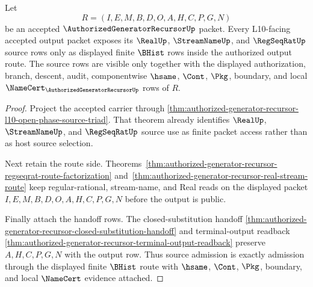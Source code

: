 \begin{theorem}
\label{thm:authorized-generator-recursor-l10-source-row-admission}
Let
$$
R=(I,E,M,B,D,O,A,H,C,P,G,N)
$$
be an accepted $\AuthorizedGeneratorRecursorUp$ packet. Every L10-facing accepted output packet exposes its $\RealUp$, $\StreamNameUp$, and $\RegSeqRatUp$ source rows only as displayed finite $\BHist$ rows inside the authorized output route. The source rows are visible only together with the displayed authorization, branch, descent, audit, componentwise $\hsame$, $\Cont$, $\Pkg$, boundary, and local $\NameCert_{\AuthorizedGeneratorRecursorUp}$ rows of $R$.
\end{theorem}
\begin{proof}
Project the accepted carrier through \autoref{thm:authorized-generator-recursor-l10-open-phase-source-triad}. That theorem already identifies $\RealUp$, $\StreamNameUp$, and $\RegSeqRatUp$ source use as finite packet access rather than as host source selection.

Next retain the route side. Theorems~\ref{thm:authorized-generator-recursor-regseqrat-route-factorization} and~\ref{thm:authorized-generator-recursor-real-stream-route} keep regular-rational, stream-name, and Real reads on the displayed packet $I,E,M,B,D,O,A,H,C,P,G,N$ before the output is public.

Finally attach the handoff rows. The closed-substitution handoff \autoref{thm:authorized-generator-recursor-closed-substitution-handoff} and terminal-output readback \autoref{thm:authorized-generator-recursor-terminal-output-readback} preserve $A,H,C,P,G,N$ with the output row. Thus source admission is exactly admission through the displayed finite $\BHist$ route with $\hsame$, $\Cont$, $\Pkg$, boundary, and local $\NameCert$ evidence attached.
\end{proof}

